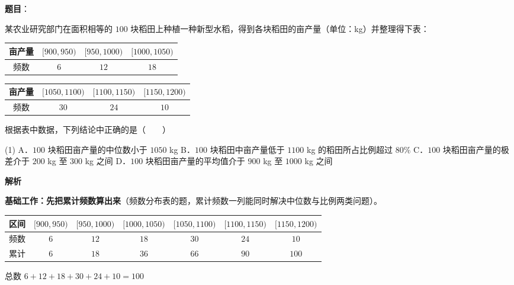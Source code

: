 \begin{answer}

\textbf{题目}：

某农业研究部门在面积相等的 $100$ 块稻田上种植一种新型水稻，得到各块稻田的亩产量（单位：kg）并整理得下表：

\begin{center}
\begin{tabular}{cccc}
\toprule
亩产量 & $[900,950)$ & $[950,1000)$ & $[1000,1050)$ \\
\midrule
频数 & $6$ & $12$ & $18$ \\
\bottomrule
\end{tabular}
\end{center}

\begin{center}
\begin{tabular}{cccc}
\toprule
亩产量 & $[1050,1100)$ & $[1100,1150)$ & $[1150,1200)$ \\
\midrule
频数 & $30$ & $24$ & $10$ \\
\bottomrule
\end{tabular}
\end{center}

  根据表中数据，下列结论中正确的是\mbox{（　　）}

\begin{gkopts}(1)
\task A．$100$ 块稻田亩产量的中位数小于 $1050$ kg
\task B．$100$ 块稻田中亩产量低于 $1100$ kg 的稻田所占比例超过 $80\%$
\task C．$100$ 块稻田亩产量的极差介于 $200$ kg 至 $300$ kg 之间
\task D．$100$ 块稻田亩产量的平均值介于 $900$ kg 至 $1000$ kg 之间
\end{gkopts}

\textbf{解析}

\textbf{基础工作：先把累计频数算出来}（频数分布表的题，累计频数一列能同时解决中位数与比例两类问题）。

\begin{center}
\begin{tabular}{lcccccc}
\toprule
区间 & $[900,950)$ & $[950,1000)$ & $[1000,1050)$ & $[1050,1100)$ & $[1100,1150)$ & $[1150,1200)$ \\
\midrule
频数 & $6$ & $12$ & $18$ & $30$ & $24$ & $10$ \\
累计 & $6$ & $18$ & $36$ & $66$ & $90$ & $100$ \\
\bottomrule
\end{tabular}
\end{center}

总数 $6+12+18+30+24+10=100$ 


\end{answer}

